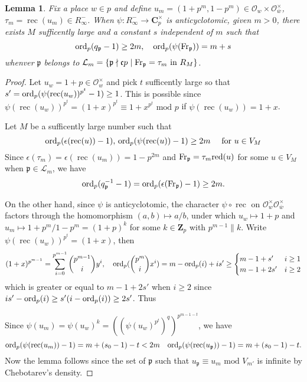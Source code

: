 \documentclass[leqno]{amsart}
\newcommand{\bw}{\overline{w}}
\newcommand{\Fr}{\textnormal{Fr}} %
\DeclareMathOperator{\rec}{rec}
\newcommand{\red}{\textnormal{red}}
\newcommand{\ord}{\textnormal{ord}}
\newcommand{\Zp}{\mathbf{Z}_p}
\newcommand{\C}{\mathbf C}
\newcommand{\oo}{\mathcal{O}} %
\newcommand{\fc}{\mathfrak{c}}
\newcommand{\fp}{\mathfrak{p}}
\newtheorem{lem}[thm]{Lemma}
\theoremstyle{definition}
\theoremstyle{remark}
\begin{document}
\begin{lem}
Fix a place $w\in p$ and
define $u_m=(1+p^m,1-p^m)\in \oo_w\times \oo_{\bw}^\times$,
$\tau_m=\rec(u_m)\in R_\infty^-$.
When $\psi\colon R_\infty^-\to \C_p^\times$
is anticyclotomic,
given $m>0$,
there exists  $M$ sufficently large
and a constant  $s$ independent of  $m$
such that 
\[
	\ord_p(q_\fp-1)\geq 2m,\quad
	\ord_p(\psi(\Fr_\fp))=m+s
\]
whenver $\fp$ belongs to 
$\mathcal{L}_m=
\{\fp\nmid \fc p\mid \Fr_\fp=\tau_m \text{ in } R_M\}$.
\end{lem}
\begin{proof}
Let $u_w=1+p\in \oo_w^\times$
and pick $t$ sufficently large so that
$s'=\ord_p(\psi(\rec(u_w))^{p^t}-1)\geq 1$.
This is possible since
$\psi(\rec(u_w))^{p^t}=(1+x)^{p^t}\equiv 
1+x^{p^t}\text{ mod }p$ if
$\psi(\rec(u_w))=1+x$.

Let $M$ be a sufficently large number such that
\[
	\ord_p(\epsilon(\rec(u))-1),\,
	\ord_p(\psi(\rec(u))-1)\geq 2m\quad
	\text{ for } u\in V_{M}
\]
Since 
$\epsilon(\tau_m)=\epsilon(\rec(u_m))=1-p^{2m}$
and $\Fr_\fp=\tau_m\red(u)$ for some $u\in V_M$
when $\fp\in \mathcal{L}_m$, we have 
\[
\ord_p(q_\fp^{-1}-1)=
\ord_p(\epsilon(\Fr_\fp)-1)\geq 2m.
\]

On the other hand,
since $\psi$ is anticyclotomic, the character
$\psi\circ \rec$ on $\oo_w^\times\oo_{\bw}^\times$
factors through the homomorphism $(a,b)\mapsto a/b$,
under which
$u_w\mapsto 1+p$ and
$u_m\mapsto 1+p^m/1-p^m=(1+p)^k$
for some $k\in \Zp$ with $p^{m-1}\parallel k$. 
Write $\psi(\rec(u_w))^{p^t}=(1+x)$, then
\[
	(1+x)^{p^{m-1}}=\sum_{i=0}^{p^{m-1}}
	\binom{p^{m-1}}{i}y^i,\quad
	\ord_p(\binom{p^m}{i}x^i)=m-\ord_p(i)+is'\geq
	\begin{cases}
		m-1+s'& i\geq 1\\
		m-1+2s' & i\geq 2
	\end{cases}
\]
which is greater or equal to $m-1+2s'$ when  $i\geq 2$
since  $is'-\ord_p(i)\geq s'(i-\ord_p(i))\geq 2s'$.
Thus 


Since 
$\psi(u_m)=\psi(u_w)^k=((\psi(u_w)^{p^t})^q)^{p^{m-1-t}}$,
we have
\[
\ord_p(\psi(\rec(u_m))-1)=m+(s_0-1)-t<2m\quad
\ord_p(\psi(\rec(u_\fp))-1)=m+(s_0-1)-t.
\]
Now the lemma follows since 
the set of $\fp$ 
such that  $u_\fp\equiv u_m\text{ mod }V_{m'}$
is infinite by Chebotarev's density.
\end{proof}
\end{document}
